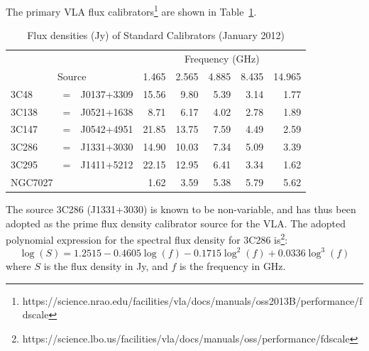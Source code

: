 \documentclass[letterpaper,11pt]{report}
\begin{document}
The primary VLA flux
calibrators\footnote{\ttfamily https://science.nrao.edu/facilities/vla/docs/manuals/oss2013B/performance/fdscale}
are shown in Table~\ref{tab:fluxcal}.
\begin{table}[h!tb]
    \begin{center}\label{tab:fluxcal}
        \caption{Flux densities (Jy) of Standard Calibrators (January 2012)}
\begin{tabular}{|lcl|rrrrr| }
\hline       
       & &                    & \multicolumn{5}{c|}{Frequency (GHz)} \\
\cline{4-8}
\multicolumn{3}{|c|}{Source} & 1.465  & 2.565  & 4.885 & 8.435 & 14.965 \\
\hline
3C48   &=& J0137+3309         & 15.56 &  9.80 & 5.39 & 3.14 & 1.77 \\
3C138  &=& J0521+1638         &  8.71 &  6.17 & 4.02 & 2.78 & 1.89 \\
3C147  &=& J0542+4951         & 21.85 & 13.75 & 7.59 & 4.49 & 2.59 \\
\hline
3C286  &=& J1331+3030         & 14.90 & 10.03 & 7.34 & 5.09 & 3.39 \\
3C295  &=& J1411+5212         & 22.15 & 12.95 & 6.41 & 3.34 & 1.62 \\
NGC7027 &&                    &  1.62 &  3.59 & 5.38 & 5.79 & 5.62 \\
\hline
       \end{tabular}
    \end{center}
\end{table}
The source 3C286 (J1331+3030) is known to be non-variable, and has thus been 
adopted as the prime flux density calibrator source for the VLA. The adopted 
polynomial expression for the spectral flux density for 3C286 
is\footnote{\ttfamily https://science.lbo.us/facilities/vla/docs/manuals/oss/performance/fdscale}:
\begin{equation}
\log(S) = 1.2515 - 0.4605\log(f)  - 0.1715\log^2(f) + 0.0336\log^3(f)
\end{equation}
where $S$ is the flux density in Jy, and $f$ is the frequency in GHz.
\end{document}
